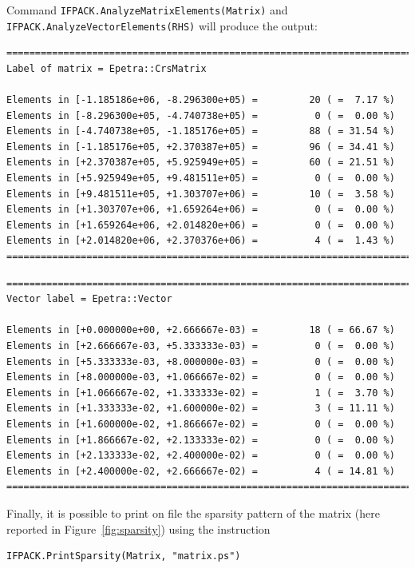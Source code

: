 \documentclass[10pt,relax]{SANDreport}
\begin{document}
Command \verb!IFPACK.AnalyzeMatrixElements(Matrix)! and
\verb!IFPACK.AnalyzeVectorElements(RHS)! will produce the output:
\begin{verbatim}
================================================================================
Label of matrix = Epetra::CrsMatrix

Elements in [-1.185186e+06, -8.296300e+05) =         20 ( =  7.17 %)
Elements in [-8.296300e+05, -4.740738e+05) =          0 ( =  0.00 %)
Elements in [-4.740738e+05, -1.185176e+05) =         88 ( = 31.54 %)
Elements in [-1.185176e+05, +2.370387e+05) =         96 ( = 34.41 %)
Elements in [+2.370387e+05, +5.925949e+05) =         60 ( = 21.51 %)
Elements in [+5.925949e+05, +9.481511e+05) =          0 ( =  0.00 %)
Elements in [+9.481511e+05, +1.303707e+06) =         10 ( =  3.58 %)
Elements in [+1.303707e+06, +1.659264e+06) =          0 ( =  0.00 %)
Elements in [+1.659264e+06, +2.014820e+06) =          0 ( =  0.00 %)
Elements in [+2.014820e+06, +2.370376e+06) =          4 ( =  1.43 %)
================================================================================
\end{verbatim}

\begin{verbatim}
================================================================================
Vector label = Epetra::Vector

Elements in [+0.000000e+00, +2.666667e-03) =         18 ( = 66.67 %)
Elements in [+2.666667e-03, +5.333333e-03) =          0 ( =  0.00 %)
Elements in [+5.333333e-03, +8.000000e-03) =          0 ( =  0.00 %)
Elements in [+8.000000e-03, +1.066667e-02) =          0 ( =  0.00 %)
Elements in [+1.066667e-02, +1.333333e-02) =          1 ( =  3.70 %)
Elements in [+1.333333e-02, +1.600000e-02) =          3 ( = 11.11 %)
Elements in [+1.600000e-02, +1.866667e-02) =          0 ( =  0.00 %)
Elements in [+1.866667e-02, +2.133333e-02) =          0 ( =  0.00 %)
Elements in [+2.133333e-02, +2.400000e-02) =          0 ( =  0.00 %)
Elements in [+2.400000e-02, +2.666667e-02) =          4 ( = 14.81 %)
================================================================================
\end{verbatim}

Finally, it is possible to print on file the sparsity pattern of the matrix
(here reported in Figure~\ref{fig:sparsity}) using the instruction
\begin{verbatim}
IFPACK.PrintSparsity(Matrix, "matrix.ps")
\end{verbatim}
\end{document}
